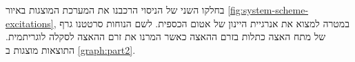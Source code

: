 \documentclass{article}
\begin{document}

בחלקו השני של הניסוי הרכבנו את המערכת המוצגות באיור
\ref{fig:system-scheme-excitations}, 
במטרה למצוא את אנרגיית היינון של אטום הכספית.
לשם הנוחות סרטטנו גרף של מתח האצה כתלות בזרם ההאצה כאשר המרנו את זרם ההאצה לסקלה לוגריתמית.
התוצאות מוצגות ב
\ref{graph:part2}.






\end{document}
